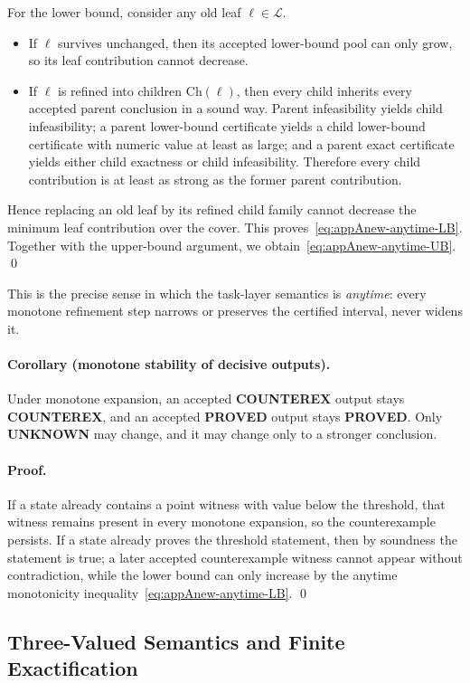 For the lower bound, consider any old leaf $\ell\in \mathcal L$.
\begin{itemize}
    \item If $\ell$ survives unchanged, then its accepted lower-bound pool can only grow, so its leaf contribution cannot decrease.
    \item If $\ell$ is refined into children $\mathrm{Ch}(\ell)$, then every child inherits every accepted parent conclusion in a sound way. Parent infeasibility yields child infeasibility; a parent lower-bound certificate yields a child lower-bound certificate with numeric value at least as large; and a parent exact certificate yields either child exactness or child infeasibility. Therefore every child contribution is at least as strong as the former parent contribution.
\end{itemize}
Hence replacing an old leaf by its refined child family cannot decrease the minimum leaf contribution over the cover. This proves~\eqref{eq:appAnew-anytime-LB}. Together with the upper-bound argument, we obtain~\eqref{eq:appAnew-anytime-UB}. \qed

This is the precise sense in which the task-layer semantics is \emph{anytime}: every monotone refinement step narrows or preserves the certified interval, never widens it.

\paragraph{\normalfont Corollary (monotone stability of decisive outputs).}
Under monotone expansion, an accepted \textbf{COUNTEREX} output stays \textbf{COUNTEREX}, and an accepted \textbf{PROVED} output stays \textbf{PROVED}. Only \textbf{UNKNOWN} may change, and it may change only to a stronger conclusion.

\paragraph{\normalfont Proof.}
If a state already contains a point witness with value below the threshold, that witness remains present in every monotone expansion, so the counterexample persists. If a state already proves the threshold statement, then by soundness the statement is true; a later accepted counterexample witness cannot appear without contradiction, while the lower bound can only increase by the anytime monotonicity inequality~\eqref{eq:appAnew-anytime-LB}. \qed

\subsection{Three-Valued Semantics and Finite Exactification}

